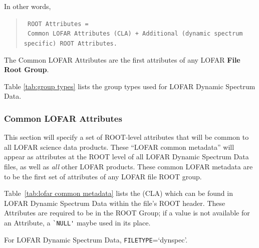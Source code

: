 \documentclass[a4paper,10pt,bibtotoc]{scrartcl}
\begin{document}
In other words,
\begin{verse}
  \verb| ROOT Attributes = |\\
  \verb| Common LOFAR Attributes (CLA) + Additional (dynamic spectrum specific) ROOT Attributes.|
\end{verse}

The Common LOFAR Attributes are the first attributes of any LOFAR \textbf{File Root Group}.

Table \ref{tab:group types} lists the group types used for LOFAR Dynamic Spectrum
Data.

 
\subsubsection{Common LOFAR Attributes}
\label{sec:lofar common attributes}

This section will specify a set of ROOT-level attributes that will be common to
all LOFAR science data products.  These ``LOFAR common metadata'' will appear as attributes
at the ROOT level of all LOFAR Dynamic Spectrum Data files, as well as 
\textit{all} other LOFAR products.  These common LOFAR metadata are to
be the first set of attributes of any LOFAR file ROOT group. 

Table~\ref{tab:lofar common metadata} lists the {\cla} (CLA) which can be found 
in LOFAR Dynamic Spectrum Data within the file's ROOT header. 
These Attributes are required to be in the ROOT Group; if a
value is not available for an Attribute, a \verb|`NULL'| maybe used in its place.

For LOFAR Dynamic Spectrum Data, \verb|FILETYPE|=`dynspec'.


\end{document}
